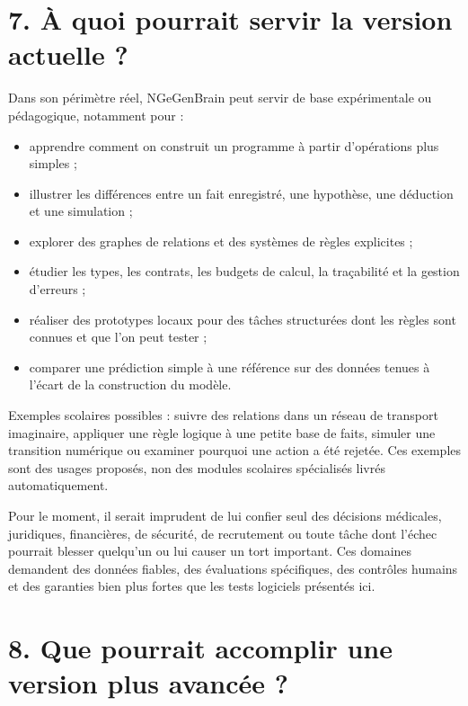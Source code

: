 \documentclass[11pt,a4paper]{article}
\begin{document}
\section*{7. À quoi pourrait servir la version actuelle ?}

Dans son périmètre réel, NGeGenBrain peut servir de base expérimentale ou pédagogique, notamment pour :
\begin{itemize}
  \item apprendre comment on construit un programme à partir d'opérations plus simples ;
  \item illustrer les différences entre un fait enregistré, une hypothèse, une déduction et une simulation ;
  \item explorer des graphes de relations et des systèmes de règles explicites ;
  \item étudier les types, les contrats, les budgets de calcul, la traçabilité et la gestion d'erreurs ;
  \item réaliser des prototypes locaux pour des tâches structurées dont les règles sont connues et que l'on peut tester ;
  \item comparer une prédiction simple à une référence sur des données tenues à l'écart de la construction du modèle.
\end{itemize}

Exemples scolaires possibles : suivre des relations dans un réseau de transport imaginaire, appliquer une règle logique à une petite base de faits, simuler une transition numérique ou examiner pourquoi une action a été rejetée. Ces exemples sont des usages proposés, non des modules scolaires spécialisés livrés automatiquement.

Pour le moment, il serait imprudent de lui confier seul des décisions médicales, juridiques, financières, de sécurité, de recrutement ou toute tâche dont l'échec pourrait blesser quelqu'un ou lui causer un tort important. Ces domaines demandent des données fiables, des évaluations spécifiques, des contrôles humains et des garanties bien plus fortes que les tests logiciels présentés ici.

\section*{8. Que pourrait accomplir une version plus avancée ?}
\end{document}
